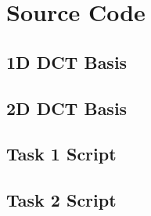 \section{Source Code}

\subsection{1D DCT Basis}



\subsection{2D DCT Basis}




\pagebreak

\subsection{Task 1 Script}



\pagebreak

\subsection{Task 2 Script}


